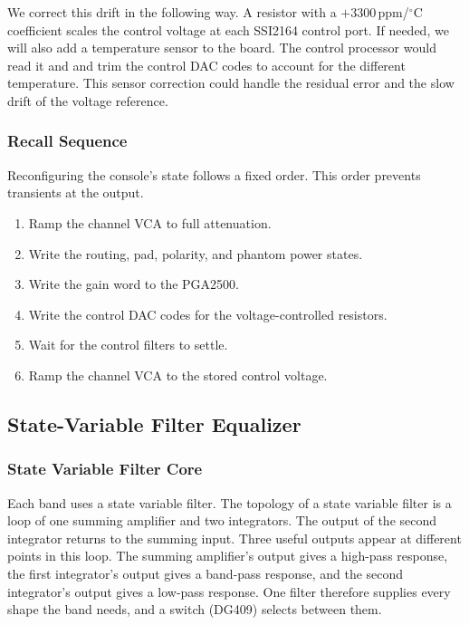 \documentclass[11pt, letterpaper,titlepage]{article}
\begin{document}
We correct this drift in the following way. A resistor with a $+3300$\,ppm/$^\circ$C
coefficient scales the control voltage at each SSI2164 control port. If needed, we will also add a temperature sensor to the board. The
control processor would read it and and trim the
control DAC codes to account for the different temperature. This sensor correction could handle the residual error and the
slow drift of the voltage reference.



\subsubsection*{Recall Sequence}
\label{sssec:recall}

Reconfiguring the console's state follows a fixed order. This order prevents transients at the output.

\begin{enumerate}
    \item Ramp the channel VCA to full attenuation.
    \item Write the routing, pad, polarity, and phantom power states.
    \item Write the gain word to the PGA2500.
    \item Write the control DAC codes for the voltage-controlled resistors.
    \item Wait for the control filters to settle.
    \item Ramp the channel VCA to the stored control voltage.
\end{enumerate}


\subsection{State-Variable Filter Equalizer}
\label{ssec:eq}

\subsubsection*{State Variable Filter Core}
\label{sssec:svf}

Each band uses a state variable filter. The topology of a state variable filter is a loop of one summing
amplifier and two integrators. The output of the second integrator returns to
the summing input. Three useful outputs appear at different points in this loop. The summing amplifier's output
gives a high-pass response, the first integrator's output gives a band-pass response, and
the second integrator's output gives a low-pass response. One filter therefore supplies every shape
the band needs, and a switch (DG409) selects between them.
\end{document}
